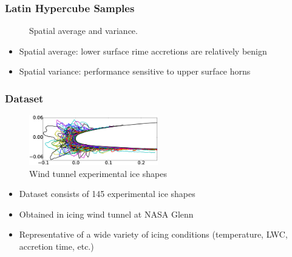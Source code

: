 \documentclass[9pt]{beamer}
\begin{document}
\begin{frame}
\frametitle{Latin Hypercube Samples}
\label{sec-3-12}

\vspace*{-0.0cm}\begin{figure}
      \caption{Spatial average and variance.}
\end{figure}
\begin{itemize}
\item Spatial average: lower surface rime accretions are relatively benign
\item Spatial variance: performance sensitive to upper surface horns
\end{itemize}
\end{frame}
\begin{frame}
\frametitle{Dataset}
\label{sec-3-13}

\vspace*{-0.0cm}\begin{figure}
      \includegraphics[width=0.5\textwidth]{GlobalDataSet}
      \caption{Wind tunnel experimental ice shapes}
\end{figure}
\begin{itemize}
\item Dataset consists of 145 experimental ice shapes
\item Obtained in icing wind tunnel at NASA Glenn\footnotemark[1]
\item Representative of a wide variety of icing conditions (temperature,
  LWC, accretion time, etc.)
\end{itemize}
\end{frame}
\end{document}
